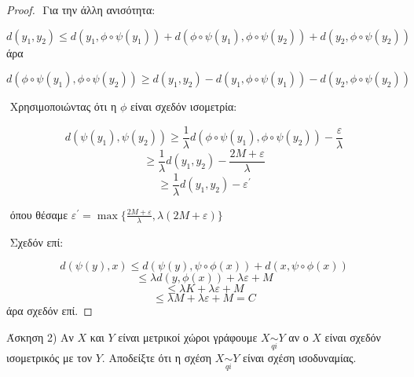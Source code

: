 \documentclass[oneside,a4paper]{article}
\begin{document}
\begin{proof}
$ $\newline
Για την άλλη ανισότητα:


$$d(y_1,y_2) \leq d(y_1,\phi\circ\psi(y_1)) + d(\phi\circ\psi(y_1), \phi\circ\psi(y_2)) + d(y_2,\phi\circ\psi(y_2))$$ άρα 

$$d(\phi\circ\psi (y_1) ,\phi\circ\psi(y_2)) \geq d(y_1,y_2) - d(y_1,\phi\circ\psi (y_1)) - d(y_2,\phi\circ\psi(y_2))$$

$ $\newline
Χρησιμοποιώντας ότι η $\phi$ είναι σχεδόν ισομετρία:

$$d(\psi(y_1),\psi(y_2)) \geq \frac{1}{\lambda} d(\phi\circ\psi(y_1),\phi\circ\psi(y_2)) - \frac{\varepsilon}{\lambda}$$
$$\geq \frac{1}{\lambda} d(y_1,y_2) - \frac{2M + \varepsilon}{\lambda}$$
$$\geq \frac{1}{\lambda} d(y_1,y_2) - \varepsilon^{\prime}$$

$ $\newline
όπου θέσαμε $\varepsilon^{\prime} = \max \{\frac{2M+\varepsilon}{\lambda}, \lambda(2M + \varepsilon)\}$

$ $\newline
Σχεδόν επί:


$$d(\psi(y),x) \leq d(\psi(y),\psi \circ \phi(x)) + d(x,\psi\circ \phi(x))$$
$$\leq \lambda d(y,\phi(x)) + \lambda \varepsilon + M$$
$$\leq \lambda K + \lambda \varepsilon + M$$
$$\leq  \lambda M + \lambda \varepsilon + M = C$$ άρα σχεδόν επί.

\end{proof}

\pagebreak 


\noindent Άσκηση 2) Αν $X$ και $Y$ είναι μετρικοί χώροι γράφουμε $X \underset{qi}{\sim} Y$ αν ο $X$ είναι σχεδόν ισομετρικός με τον $Y$. Αποδείξτε ότι η σχέση $X \underset{qi}{\sim} Y$ είναι σχέση ισοδυναμίας.
\end{document}
